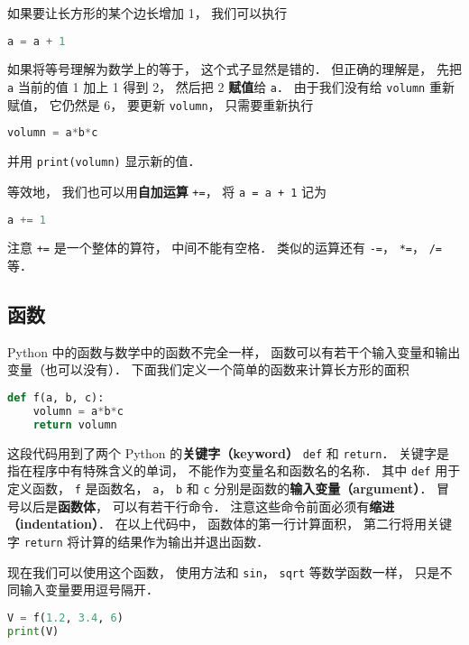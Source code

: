 如果要让长方形的某个边长增加 1， 我们可以执行
\begin{lstlisting}[language=python]
a = a + 1
\end{lstlisting}
如果将等号理解为数学上的等于， 这个式子显然是错的． 但正确的理解是， 先把 \verb|a| 当前的值 1 加上 1 得到 2， 然后把 2 \textbf{赋值}给 \verb|a|． 由于我们没有给 \verb|volumn| 重新赋值， 它仍然是 6， 要更新 \verb|volumn|， 只需要重新执行
\begin{lstlisting}[language=python]
volumn = a*b*c
\end{lstlisting}
并用 \verb|print(volumn)| 显示新的值．

等效地， 我们也可以用\textbf{自加运算} \verb|+=|， 将 \verb|a = a + 1| 记为
\begin{lstlisting}[language=python]
a += 1
\end{lstlisting}
注意 \verb|+=| 是一个整体的算符， 中间不能有空格． 类似的运算还有 \verb|-=|， \verb|*=|， \verb|/=| 等．

\subsection{函数}
Python 中的函数与数学中的函数不完全一样， 函数可以有若干个输入变量和输出变量（也可以没有）． 下面我们定义一个简单的函数来计算长方形的面积
\begin{lstlisting}[language=python]
def f(a, b, c):
    volumn = a*b*c
    return volumn
\end{lstlisting}
这段代码用到了两个 Python 的\textbf{关键字（keyword）} \verb|def| 和 \verb|return|． 关键字是指在程序中有特殊含义的单词， 不能作为变量名和函数名的名称． 其中 \verb|def| 用于定义函数， \verb|f| 是函数名， \verb|a|， \verb|b| 和 \verb|c| 分别是函数的\textbf{输入变量（argument）}． 冒号以后是\textbf{函数体}， 可以有若干行命令． 注意这些命令前面必须有\textbf{缩进（indentation）}．  在以上代码中， 函数体的第一行计算面积， 第二行将用关键字 \verb|return| 将计算的结果作为输出并退出函数．

现在我们可以使用这个函数， 使用方法和 \verb|sin|， \verb|sqrt| 等数学函数一样， 只是不同输入变量要用逗号隔开．
\begin{lstlisting}[language=python]
V = f(1.2, 3.4, 6)
print(V)
\end{lstlisting}

